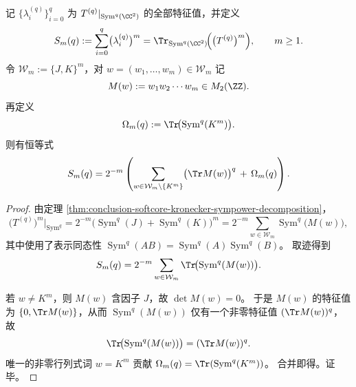 \begin{theorem}[例外幂和的字迹展开]\label{thm:conclusion-softcore-exceptional-word-trace-expansion}
记 \(\{\lambda_i^{(q)}\}_{i=0}^{q}\) 为
\(
T^{(q)}|_{\operatorname{Sym}^q(\CC^2)}
\)
的全部特征值，并定义
\[
S_m(q):=\sum_{i=0}^{q}\bigl(\lambda_i^{(q)}\bigr)^m
=\Tr_{\operatorname{Sym}^q(\CC^2)}\!\Bigl(\bigl(T^{(q)}\bigr)^m\Bigr),
\qquad m\ge 1.
\]
令 \(\mathcal W_m:=\{J,K\}^m\)，对 \(w=(w_1,\dots,w_m)\in\mathcal W_m\) 记
\[
M(w):=w_1w_2\cdots w_m\in M_2(\ZZ).
\]
再定义
\[
\Omega_m(q):=\Tr\!\bigl(\operatorname{Sym}^q(K^m)\bigr).
\]
则有恒等式
\[
S_m(q)
=2^{-m}\left(
\sum_{w\in\mathcal W_m\setminus\{K^m\}}
\bigl(\Tr M(w)\bigr)^q
\,+\,\Omega_m(q)\right).
\]
\end{theorem}
\begin{proof}
由定理 \ref{thm:conclusion-softcore-kronecker-sympower-decomposition}，
\[
\bigl(T^{(q)}\bigr)^m\big|_{\operatorname{Sym}^q}
=2^{-m}\bigl(\operatorname{Sym}^q(J)+\operatorname{Sym}^q(K)\bigr)^m
=2^{-m}\sum_{w\in\mathcal W_m}\operatorname{Sym}^q\!\bigl(M(w)\bigr),
\]
其中使用了表示同态性
\(
\operatorname{Sym}^q(AB)=\operatorname{Sym}^q(A)\operatorname{Sym}^q(B)
\)。
取迹得到
\[
S_m(q)=2^{-m}\sum_{w\in\mathcal W_m}
\Tr\!\bigl(\operatorname{Sym}^q(M(w))\bigr).
\]

若 \(w\neq K^m\)，则 \(M(w)\) 含因子 \(J\)，故 \(\det M(w)=0\)。
于是 \(M(w)\) 的特征值为 \(\{0,\Tr M(w)\}\)，从而
\(
\operatorname{Sym}^q(M(w))
\)
仅有一个非零特征值 \((\Tr M(w))^q\)，故
\[
\Tr\!\bigl(\operatorname{Sym}^q(M(w))\bigr)=(\Tr M(w))^q.
\]
唯一的非零行列式词 \(w=K^m\) 贡献
\(
\Omega_m(q)=\Tr(\operatorname{Sym}^q(K^m))
\)。
合并即得。证毕。
\end{proof}


